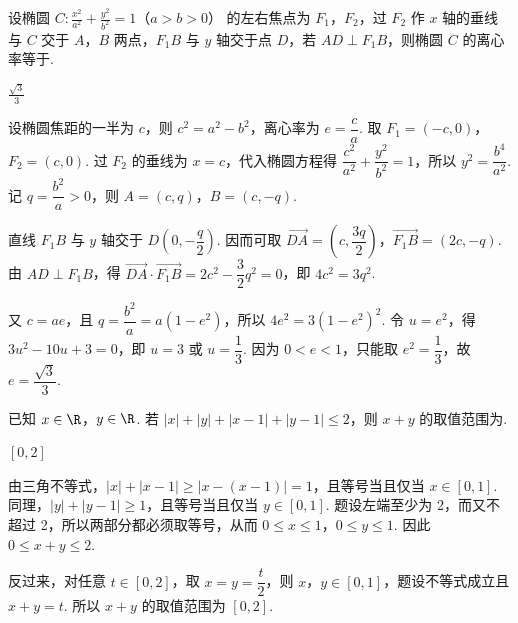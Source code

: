\begin{problem}
设椭圆 \(C: \frac{x^2}{a^2} + \frac{y^2}{b^2} = 1\)（\(a > b > 0\)） 的左右焦点为 \(F_1\)，\(F_2\)，过 \(F_2\) 作 \(x\) 轴的垂线与 \(C\) 交于 \(A\)，\(B\) 两点，\(F_1B\) 与 \(y\) 轴交于点 \(D\)，若 \(AD \perp F_1B\)，则椭圆 \(C\) 的离心率等于\fillinblank{}.
\end{problem}

\begin{answer}
\(\frac{\sqrt{3}}{3}\)
\end{answer}

\begin{solution}
设椭圆焦距的一半为 \(c\)，则 \(c^2=a^2-b^2\)，离心率为 \(e=\dfrac ca\). 取 \(F_1=(-c,0)\)，\(F_2=(c,0)\). 过 \(F_2\) 的垂线为 \(x=c\)，代入椭圆方程得
\(\dfrac{c^2}{a^2}+\dfrac{y^2}{b^2}=1\)，所以 \(y^2=\dfrac{b^4}{a^2}\). 记 \(q=\dfrac{b^2}{a}>0\)，则 \(A=(c,q)\)，\(B=(c,-q)\).

直线 \(F_1B\) 与 \(y\) 轴交于 \(D\left(0,-\dfrac q2\right)\). 因而可取
\(\overrightarrow{DA}=\left(c,\dfrac{3q}{2}\right)\)，\(\overrightarrow{F_1B}=(2c,-q)\). 由 \(AD\perp F_1B\)，得
\(\overrightarrow{DA}\mathbin{\cdot}\overrightarrow{F_1B}=2c^2-\dfrac32q^2=0\)，即 \(4c^2=3q^2\).

又 \(c=ae\)，且 \(q=\dfrac{b^2}{a}=a(1-e^2)\)，所以 \(4e^2=3(1-e^2)^2\). 令 \(u=e^2\)，得 \(3u^2-10u+3=0\)，即 \(u=3\) 或 \(u=\dfrac13\). 因为 \(0<e<1\)，只能取 \(e^2=\dfrac13\)，故 \(e=\dfrac{\sqrt3}{3}\).
\end{solution}

\begin{problem}
已知 \(x\in\R\)，\(y\in\R\). 若 \(|x| + |y| + |x - 1| + |y - 1| \leqslant 2\)，则 \(x + y\) 的取值范围为\fillinblank{}.
\end{problem}

\begin{answer}
\([0,2]\)
\end{answer}

\begin{solution}
由三角不等式，\(\lvert x\rvert+\lvert x-1\rvert\geqslant\lvert x-(x-1)\rvert=1\)，且等号当且仅当 \(x\in[0,1]\). 同理，\(\lvert y\rvert+\lvert y-1\rvert\geqslant1\)，且等号当且仅当 \(y\in[0,1]\). 题设左端至少为 2，而又不超过 2，所以两部分都必须取等号，从而 \(0\leqslant x\leqslant1\)，\(0\leqslant y\leqslant1\). 因此 \(0\leqslant x+y\leqslant2\).

反过来，对任意 \(t\in[0,2]\)，取 \(x=y=\dfrac t2\)，则 \(x\)，\(y\in[0,1]\)，题设不等式成立且 \(x+y=t\). 所以 \(x+y\) 的取值范围为 \([0,2]\).
\end{solution}

